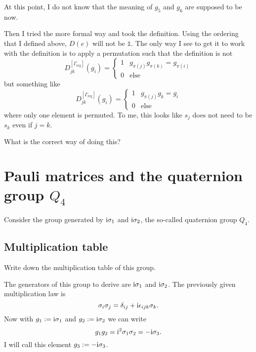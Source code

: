 \documentclass[11pt, english, fleqn, DIV=15, headinclude, BCOR=1cm]{scrartcl}
\begin{document}
\begin{question}
    At this point, I do not know that the meaning of $g_5$ and $g_6$ are
    supposed to be now.

    Then I tried the more formal way and took the definition. Using the
    ordering that I defined above, $D(e)$ will not be $\mathbb 1$. The only way
    I see to get it to work with the definition is to apply a permutation such
    that the definition is not
    \[
        D_{jk}^{[\Gamma_\text{reg}]} (g_i) =
        \begin{cases}
            1 & g_{\pi(j)} g_{\pi(k)} = g_{\pi(i)} \\
            0 & \text{else}
        \end{cases}
    \]
    but something like
    \[
        D_{jk}^{[\Gamma_\text{reg}]} (g_i) =
        \begin{cases}
            1 & g_{\pi(j)} g_{k} = g_{i} \\
            0 & \text{else}
        \end{cases}
    \]
    where only one element is permuted. To me, this looks like $s_j$ does not
    need to be $s_k$ even if $j = k$.

    What is the correct way of doing this?
\end{question}

\section{Pauli matrices and the quaternion group $Q_4$}

\newcommand\1{\sigma_1}
\newcommand\2{\sigma_2}
\newcommand\3{\sigma_3}

\begin{problem}
    Consider the group generated by $\iup\1$ and $\iup\2$, the so-called
    quaternion group $Q_4$.
\end{problem}

\subsection{Multiplication table}

\begin{problem}
    Write down the multiplication table of this group.
\end{problem}

The generators of this group to derive are $\iup\1$ and $\iup\2$. The
previously given multiplication law is
\[
    \sigma_i\sigma_j = \delta_{ij} + \mathrm i \epsilon_{ijk} \sigma_k.
\]
Now with $g_1 := \iup\1$ and $g_2 := \iup\2$ we can write
\[
    g_1 g_2 = \iup^2 \1\2 = - \iup \sigma_3.
\]
I will call this element $g_3 := - \mathrm i \sigma_3$.
\end{document}

